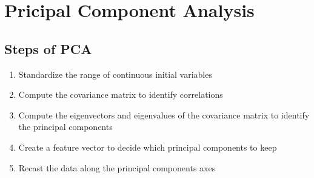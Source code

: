 \documentclass{article}
\begin{document}
\section{Pricipal Component Analysis}

\subsection{Steps of PCA}
\begin{enumerate}
								\item Standardize the range of continuous initial variables
								\item Compute the covariance matrix to identify correlations
								\item Compute the eigenvectors and eigenvalues of the covariance matrix to identify the principal components
								\item Create a feature vector to decide which principal components to keep
								\item Recast the data along the principal components axes
\end{enumerate}
\end{document}
